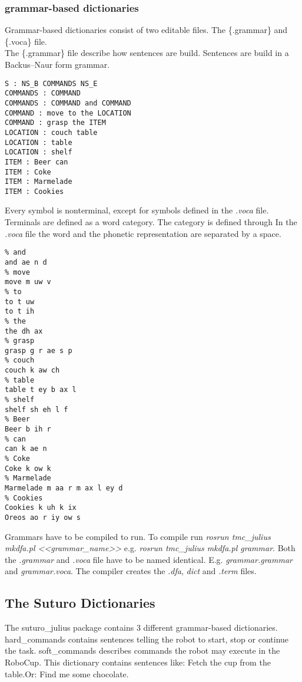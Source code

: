 \documentclass[main.tex]{subfiles}
\begin{document}
    \subsubsection{grammar-based dictionaries}
        Grammar-based dictionaries consist of two editable files. The \{.grammar\} and \{.voca\} file.\\
        The \{.grammar\} file describe how sentences are build. Sentences are build in a Backus–Naur form grammar.\\
        \begin{lstlisting}
S : NS_B COMMANDS NS_E
COMMANDS : COMMAND
COMMANDS : COMMAND and COMMAND
COMMAND : move to the LOCATION
COMMAND : grasp the ITEM
LOCATION : couch table
LOCATION : table
LOCATION : shelf
ITEM : Beer can
ITEM : Coke
ITEM : Marmelade
ITEM : Cookies
        \end{lstlisting}
        Every symbol is nonterminal, except for symbols defined in the \textit{.voca} file. Terminals are defined as a word category. The category is defined through \newline
        In the \textit{.voca} file the word and the phonetic representation are separated by a space.
        \begin{lstlisting}
% and
and ae n d
% move
move m uw v
% to
to t uw
to t ih
% the
the dh ax
% grasp
grasp g r ae s p
% couch
couch k aw ch
% table
table t ey b ax l
% shelf
shelf sh eh l f
% Beer
Beer b ih r
% can
can k ae n
% Coke
Coke k ow k
% Marmelade
Marmelade m aa r m ax l ey d
% Cookies
Cookies k uh k ix
Oreos ao r iy ow s
        \end{lstlisting}
        
        Grammars have to be compiled to run. To compile run \textit{rosrun tmc\_julius mkdfa.pl <<grammar\_name>>} e.g. \textit{rosrun tmc\_julius mkdfa.pl grammar}. Both the \textit{.grammar} and \textit{.voca} file have to be named identical. E.g. \textit{grammar.grammar} and \textit{grammar.voca}. The compiler creates the \textit{.dfa}, \textit{dict} and \textit{.term} files.	
    
    \subsection{The Suturo Dictionaries}
        The suturo\_julius package contains 3 different grammar-based dictionaries. hard\_commands contains sentences telling the robot to start, stop or continue the task.
        soft\_commands describes commands the robot may execute in the RoboCup. This dictionary contains sentences like: Fetch the cup from the table.Or: Find me some chocolate.
\end{document}
